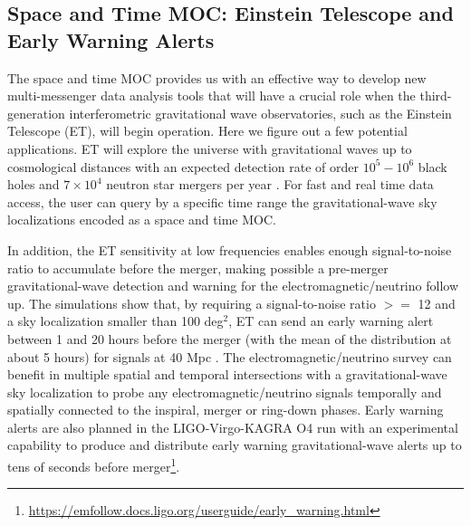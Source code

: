 \documentclass[11pt,a4paper]{ivoa}
\begin{document}
\subsection{Space and Time MOC: Einstein Telescope and Early Warning Alerts}
The space and time MOC provides us with an effective way to develop new
multi-messenger data analysis tools that will have a crucial role when
the third-generation interferometric gravitational wave observatories,
such as the Einstein Telescope (ET), will begin operation. Here we
figure out a few potential applications. ET will explore the universe
with gravitational waves up to cosmological distances with an
expected detection rate of order $10^{5} - 10^{6}$ black holes and $7\times10^4$
neutron star mergers per year \citep{2020JCAP...03..050M}.
For fast and real time data access, the user can query by a specific
time range the gravitational-wave sky localizations encoded as a space
and time MOC. 

In addition, the ET sensitivity at low frequencies enables enough
signal-to-noise ratio to accumulate before the merger, making possible
a pre-merger gravitational-wave detection and warning for the
electromagnetic/neutrino follow up.  The simulations show that, by
requiring a signal-to-noise ratio $>=$ 12 and a sky localization smaller
than 100 deg$^2$, ET can send an early warning alert between 1 and 20 hours
before the merger (with the mean of the distribution at about 5 hours)
for signals at 40 Mpc \citep{2018PhRvD..97l3014C}. The
electromagnetic/neutrino survey can benefit
in multiple spatial and temporal intersections with a gravitational-wave
sky localization to probe any electromagnetic/neutrino signals temporally
and spatially connected to the inspiral, merger or ring-down phases.
Early warning alerts are also planned in the LIGO-Virgo-KAGRA O4 run with
an experimental capability to produce and distribute early warning
gravitational-wave alerts up to tens of seconds before
merger\footnote{\url{https://emfollow.docs.ligo.org/userguide/early_warning.html}}.  
\end{document}
